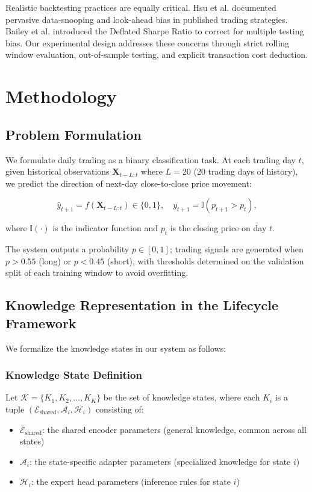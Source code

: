 \documentclass[review]{elsarticle}
\begin{document}
Realistic backtesting practices are equally critical. Hsu et al. \citep{hsu2016data} documented pervasive data-snooping and look-ahead bias in published trading strategies. Bailey et al. \citep{bailey2014pseudo} introduced the Deflated Sharpe Ratio to correct for multiple testing bias. Our experimental design addresses these concerns through strict rolling window evaluation, out-of-sample testing, and explicit transaction cost deduction.

\section{Methodology}

\subsection{Problem Formulation}

We formulate daily trading as a binary classification task. At each trading day $t$, given historical observations $\mathbf{X}_{t-L:t}$ where $L=20$ (20 trading days of history), we predict the direction of next-day close-to-close price movement:

\begin{equation}
\hat{y}_{t+1} = f(\mathbf{X}_{t-L:t}) \in \{0, 1\}, \quad y_{t+1} = \mathbb{I}(p_{t+1} > p_t),
\end{equation}

where $\mathbb{I}(\cdot)$ is the indicator function and $p_t$ is the closing price on day $t$.

The system outputs a probability $p \in [0,1]$; trading signals are generated when $p > 0.55$ (long) or $p < 0.45$ (short), with thresholds determined on the validation split of each training window to avoid overfitting.

\subsection{Knowledge Representation in the Lifecycle Framework}

We formalize the knowledge states in our system as follows:

\subsubsection{Knowledge State Definition}

Let $\mathcal{K} = \{K_1, K_2, \ldots, K_K\}$ be the set of knowledge states, where each $K_i$ is a tuple $(\mathcal{E}_{\text{shared}}, \mathcal{A}_i, \mathcal{H}_i)$ consisting of:
\begin{itemize}
\item $\mathcal{E}_{\text{shared}}$: the shared encoder parameters (general knowledge, common across all states)
\item $\mathcal{A}_i$: the state-specific adapter parameters (specialized knowledge for state $i$)
\item $\mathcal{H}_i$: the expert head parameters (inference rules for state $i$)
\end{itemize}
\end{document}
